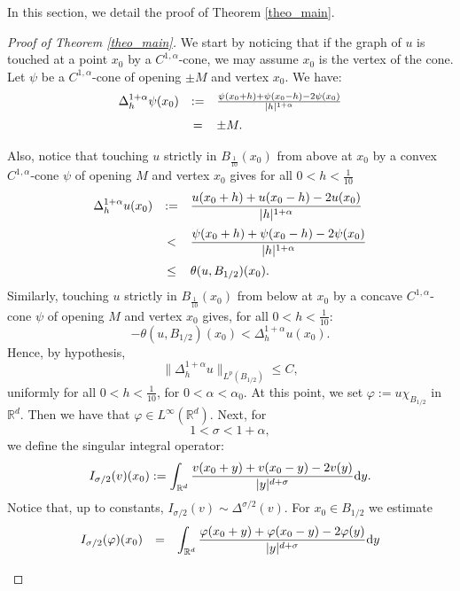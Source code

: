 \documentclass[10pt]{article} %
\begin{document}
In this section, we detail the proof of Theorem \ref{theo_main}. 
\begin{proof}[Proof of Theorem \ref{theo_main}]
We start by noticing that if the graph of $u$ is touched at a point $x_0$ by a $C^{1,\alpha}$-cone, we may assume $x_0$ is the vertex of the cone.
Let $\psi$ be a $ C ^{1,\alpha}$-cone of opening $\pm M$ and vertex $x_0$. We have:
\[
\begin{array}{lcl}
\Delta^{1+\alpha}_h\psi(x_0) & := & \frac{\psi(x_0+h) + \psi(x_0-h) - 2\psi(x_0)}{|h|^{1+\alpha}} \vspace{0.2cm}\\
 &= &  \pm M.
\end{array}
\]

Also, notice that touching $u$ strictly in $B_{\frac{1}{10}}(x_0)$  from above at $x_0$ by a convex $ C ^{1,\alpha}$-cone $\psi$ of opening $M$ and vertex $x_0$ gives for all $0< h < \frac{1}{10}$  
\[
	\begin{array}{lcl}
	\Delta^{1+\alpha}_h u(x_0) & := & \displaystyle \frac{u(x_0+h) + u(x_0-h) - 2u(x_0)}{|h|^{1+\alpha}} \vspace{0.2cm}\\
 						&< &  \displaystyle  \frac{\psi(x_0+h) + \psi(x_0-h) - 2\psi(x_0)}{|h|^{1+\alpha}} \vspace{0.2cm}\\
						&\le& \displaystyle  \theta(u,B_{1/2})(x_0).	
	\end{array}
\]
Similarly, touching $u$ strictly in $B_{\frac{1}{10}}(x_0)$  from below at $x_0$ by a concave $ C ^{1,\alpha}$-cone $\psi$ of opening $M$ and vertex $x_0$ gives, for all $0< h < \frac{1}{10}$:
$$
	-\theta(u,B_{1/2})(x_0)	 <  \Delta^{1+\alpha}_h u(x_0).
$$
Hence, by hypothesis,
$$
	\| \Delta^{1+\alpha}_h u  \|_{L^{p}(B_{1/2})} \leq C,
$$
uniformly for all $0< h < \frac{1}{10}$, for $0<\alpha < \alpha_0$. At this point, we set $\varphi := u\chi_{B_{1/2}}$ in $\mathbb{R}^d$. Then we have that $\varphi \in L^{\infty}(\mathbb{R}^d)$. Next, for 
\[
1< \sigma < 1 + \alpha,
\]
we define the singular integral operator:
\[
I_{\sigma/2}(v)(x_0) := \int_{\mathbb{R}^d}\frac{v(x_0+y) + v(x_0-y) - 2v(y)}{|y|^{d+\sigma}}{\rm d}y.
\]
Notice that, up to constants, $I_{\sigma/2}(v) \sim \Delta^{\sigma/2}(v)$. For $x_0 \in B_{1/2}$ we estimate
\[
\begin{array}{lcl}
I_{\sigma/2}(\varphi)(x_0) & = & \displaystyle \int_{\mathbb{R}^d}\frac{\varphi(x_0+y) + \varphi(x_0-y) - 2\varphi(y)}{|y|^{d+\sigma}} {\rm d}y \vspace{0.2cm} \\

\end{array}\]
\end{proof}
\end{document}
